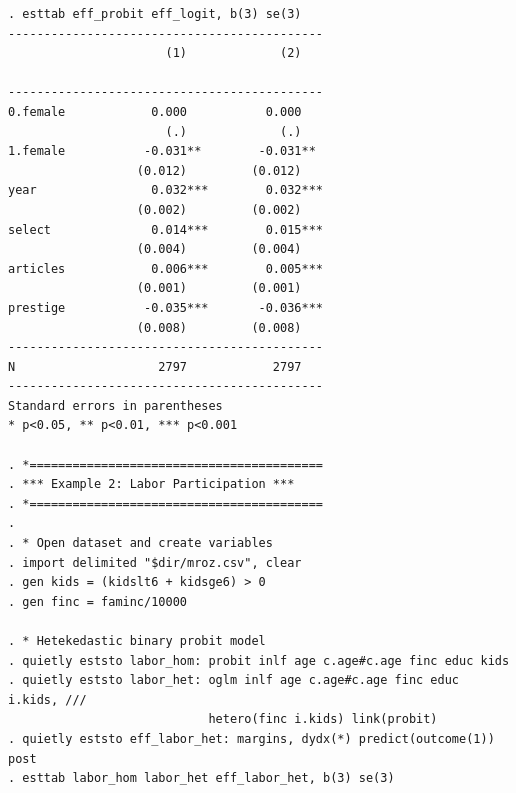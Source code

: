\begin{verbatim}
. esttab eff_probit eff_logit, b(3) se(3)
--------------------------------------------
                      (1)             (2)   
                                            
--------------------------------------------
0.female            0.000           0.000   
                      (.)             (.)   
1.female           -0.031**        -0.031** 
                  (0.012)         (0.012)   
year                0.032***        0.032***
                  (0.002)         (0.002)   
select              0.014***        0.015***
                  (0.004)         (0.004)   
articles            0.006***        0.005***
                  (0.001)         (0.001)   
prestige           -0.035***       -0.036***
                  (0.008)         (0.008)   
--------------------------------------------
N                    2797            2797   
--------------------------------------------
Standard errors in parentheses
* p<0.05, ** p<0.01, *** p<0.001

. *=========================================
. *** Example 2: Labor Participation ***
. *=========================================
. 
. * Open dataset and create variables
. import delimited "$dir/mroz.csv", clear 
. gen kids = (kidslt6 + kidsge6) > 0
. gen finc = faminc/10000

. * Hetekedastic binary probit model
. quietly eststo labor_hom: probit inlf age c.age#c.age finc educ kids
. quietly eststo labor_het: oglm inlf age c.age#c.age finc educ i.kids, ///
                            hetero(finc i.kids) link(probit)
. quietly eststo eff_labor_het: margins, dydx(*) predict(outcome(1)) post
. esttab labor_hom labor_het eff_labor_het, b(3) se(3)


\end{verbatim}
